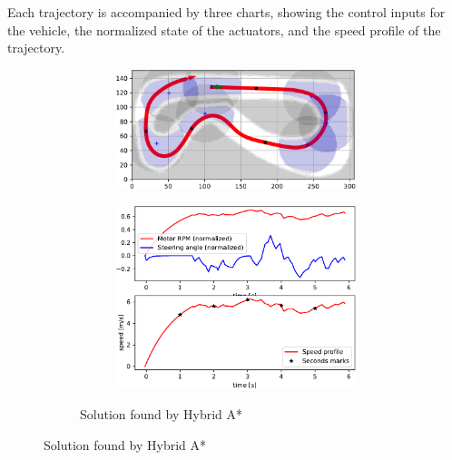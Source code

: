 Each trajectory is accompanied by three charts, showing the control inputs for the vehicle, the normalized state of the actuators, and the speed profile of the trajectory.



\begin{figure}[!tbp]%
	\centering

	\begin{subfigure}[t]{\textwidth}
		\begin{subfigure}[t]{0.45\textwidth}
			\includegraphics[width=\textwidth]{../img/experiments/porto-hybrid_astar-trajectory}
		\end{subfigure}
		\hfill
		\begin{subfigure}[t]{0.45\textwidth}
			\includegraphics[width=\textwidth]{../img/experiments/porto-hybrid_astar-actuators}
		\end{subfigure}
		\caption{Solution found by Hybrid A*}
		\label{fig:solution_porto-hybrid_astar}	
	\end{subfigure}
	

\end{figure}
